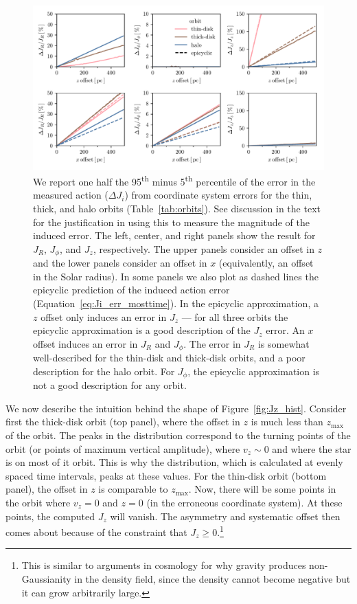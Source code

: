 \documentclass[twocolumn]{aastex62}
\newcommand{\uth}{\textsuperscript{th}}
\begin{document}
\begin{figure}[htb!]
\begin{center}
\includegraphics[width=\textwidth]{fig/schmactions_many_orbits.pdf}
\end{center}
\caption{We report one half the 95\uth{} minus 5\uth{} percentile of the error
in the measured action ($\Delta J_i$) from coordinate system errors for the
thin, thick, and halo orbits (Table~\ref{tab:orbits}). See discussion in the
text for the justification in using this to measure the magnitude of the
induced error. The left, center, and right panels show the result for $J_R$,
$J_{\phi}$, and $J_z$, respectively. The upper panels consider an offset in
$z$ and the lower panels consider an offset in $x$ (equivalently, an offset in
the Solar radius). In some panels we also plot as dashed lines the epicyclic
prediction of the induced action error (Equation~\eqref{eq:Ji_err_mosttime}).
In the epicyclic approximation, a $z$ offset only induces an error in $J_z$
--- for all three orbits the epicyclic approximation is a good description of
the $J_z$ error. An $x$ offset induces an error in $J_R$ and $J_{\phi}$. The
error in $J_R$ is somewhat well-described for the thin-disk and thick-disk
orbits, and a poor description for the halo orbit. For $J_{\phi}$, the
epicyclic approximation is not a good description for any orbit.}
\label{fig:many_orbit_wrong_ref}
\end{figure}

We now describe the intuition behind the shape of Figure~\ref{fig:Jz_hist}.
Consider first the thick-disk orbit (top panel), where the offset in $z$ is
much less than $z_{\text{max}}$ of the orbit. The peaks in the distribution
correspond to the turning points of the orbit (or points of maximum vertical
amplitude), where $v_z \sim 0$ and where the star is on most of it orbit. This
is why the distribution, which is calculated at evenly spaced time intervals, peaks at these values. For the thin-disk orbit
(bottom panel), the offset in $z$ is comparable to $z_{\text{max}}$. Now,
there will be some points in the orbit where $v_z = 0$ and $z=0$ (in the
erroneous coordinate system). At these points, the computed $J_z$
will vanish. The asymmetry and systematic offset then comes about because of
the constraint that $J_z \geq 0$.\footnote{This is similar to arguments in
cosmology for why gravity produces non-Gaussianity in the density field, since
the density cannot become negative but it can grow arbitrarily large.}
\end{document}
